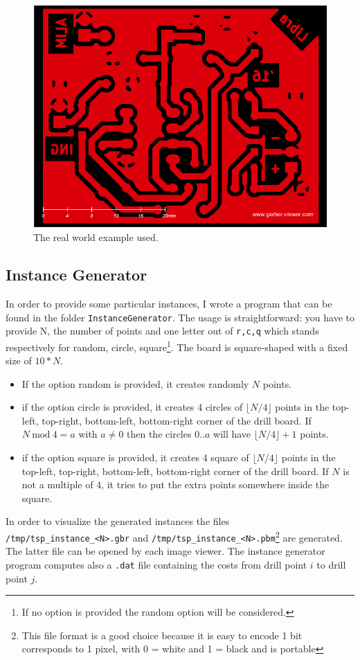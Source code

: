 \begin{figure}[ht!]
	\label{figure:pbc}
	\centering
	\includegraphics[scale=0.3]{img/real_world.png}
	\caption{The real world example used.}
\end{figure}

\subsection{Instance Generator}
\label{sec:instance:generator}
In order to provide some particular instances, I wrote a program that can be found in the folder
\verb|InstanceGenerator|. The usage is straightforward: you have to provide N, the number of points and
one letter out of \verb|r,c,q| which stands respectively for random, circle, square\footnote{If no option is provided the random option will be considered.}. The board is square-shaped with a fixed size of $10*N$.
\begin{itemize}
	\item If the option random is provided, it creates randomly $N$ points.
	\item if the option circle is provided, it creates 4 circles of $\lfloor{N/4}\rfloor$ points in the top-left, top-right, bottom-left, bottom-right corner
	of the drill board. If $N\ \text{mod} \ 4 = a$ with $a \neq 0$ then the circles $0..a$ will have $\lfloor{N/4}\rfloor + 1$ points.
	\item if the option square is provided, it creates 4 square of $\lfloor{N/4}\rfloor$ points in the top-left, top-right, bottom-left,
	bottom-right corner of the drill board. If $N$ is not a multiple of $4$, it tries to put the extra points somewhere inside the square.
\end{itemize}
In order to visualize the generated instances the files
\verb!/tmp/tsp_instance_<N>.gbr! and \verb!/tmp/tsp_instance_<N>.pbm!\footnote{This file format is a good choice because it is easy to encode 1 bit corresponds to 1 pixel, with 0 = white and 1 = black and is portable} are generated.
The latter file can be opened by each image viewer.
The instance generator program computes also a \verb|.dat| file containing the costs from drill point $i$ to drill point $j$.

